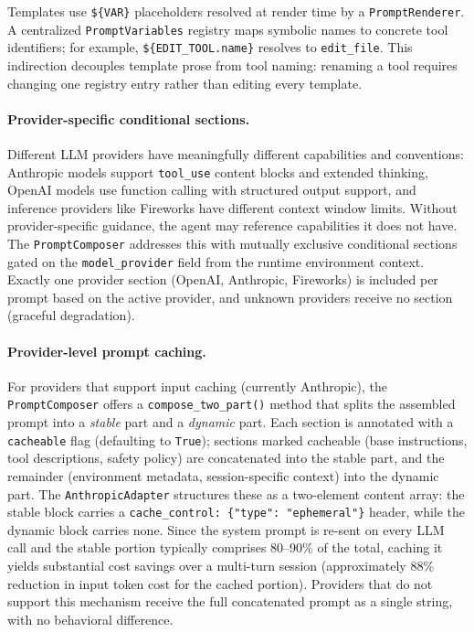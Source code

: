 Templates use \texttt{\$\{VAR\}} placeholders resolved at render time by a \texttt{PromptRenderer}. A centralized \texttt{PromptVariables} registry maps symbolic names to concrete tool identifiers; for example, \texttt{\$\{EDIT\_TOOL.name\}} resolves to \texttt{edit\_file}. This indirection decouples template prose from tool naming: renaming a tool requires changing one registry entry rather than editing every template.

\paragraph{Provider-specific conditional sections.} Different LLM providers have meaningfully different capabilities and conventions: Anthropic models support \texttt{tool\_use} content blocks and extended thinking, OpenAI models use function calling with structured output support, and inference providers like Fireworks have different context window limits. Without provider-specific guidance, the agent may reference capabilities it does not have. The \texttt{PromptComposer} addresses this with mutually exclusive conditional sections gated on the \texttt{model\_provider} field from the runtime environment context. Exactly one provider section (OpenAI, Anthropic, Fireworks) is included per prompt based on the active provider, and unknown providers receive no section (graceful degradation).

\paragraph{Provider-level prompt caching.} For providers that support input caching (currently Anthropic), the \texttt{PromptComposer} offers a \texttt{compose\_two\_part()} method that splits the assembled prompt into a \emph{stable} part and a \emph{dynamic} part. Each section is annotated with a \texttt{cacheable} flag (defaulting to \texttt{True}); sections marked cacheable (base instructions, tool descriptions, safety policy) are concatenated into the stable part, and the remainder (environment metadata, session-specific context) into the dynamic part. The \texttt{AnthropicAdapter} structures these as a two-element content array: the stable block carries a \texttt{cache\_control: \{"type": "ephemeral"\}} header, while the dynamic block carries none. Since the system prompt is re-sent on every LLM call and the stable portion typically comprises 80--90\% of the total, caching it yields substantial cost savings over a multi-turn session (approximately 88\% reduction in input token cost for the cached portion). Providers that do not support this mechanism receive the full concatenated prompt as a single string, with no behavioral difference.

